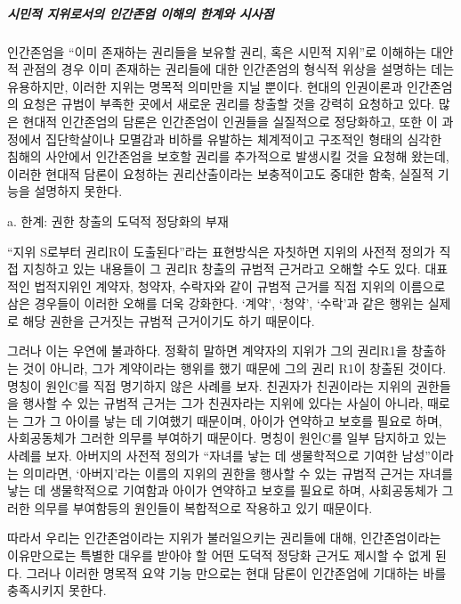 \subparagraph{시민적 지위로서의 인간존엄 이해의 한계와 시사점}

인간존엄을 ``이미 존재하는 권리들을 보유할 권리, 혹은 시민적 지위''로 이해하는 대안적 관점의 경우 이미 존재하는 권리들에 대한 인간존엄의 형식적 위상을 설명하는 데는 유용하지만, 이러한 지위는 명목적 의미만을 지닐 뿐이다. 현대의 인권이론과 인간존엄의 요청은 규범이 부족한 곳에서 새로운 권리를 창출할 것을 강력히 요청하고 있다. 많은 현대적 인간존엄의 담론은 인간존엄이 인권들을 실질적으로 정당화하고, 또한 이 과정에서 집단학살이나 모멸감과 비하를 유발하는 체계적이고 구조적인 형태의 심각한 침해의 사안에서 인간존엄을 보호할 권리를 추가적으로 발생시킬 것을 요청해 왔는데, 이러한 현대적 담론이 요청하는 권리산출이라는 보충적이고도 중대한 함축, 실질적 기능을 설명하지 못한다.

a. 한계: 권한 창출의 도덕적 정당화의 부재

``지위 S로부터 권리R이 도출된다''라는 표현방식은 자칫하면 지위의 사전적 정의가 직접 지칭하고 있는 내용들이 그 권리R 창출의 규범적 근거라고 오해할 수도 있다. 대표적인 법적지위인 계약자, 청약자, 수락자와 같이 규범적 근거를 직접 지위의 이름으로 삼은 경우들이 이러한 오해를 더욱 강화한다. `계약', `청약', `수락'과 같은 행위는 실제로 해당 권한을 근거짓는 규범적 근거이기도 하기 때문이다.

그러나 이는 우연에 불과하다. 정확히 말하면 계약자의 지위가 그의 권리R1을 창출하는 것이 아니라, 그가 계약이라는 행위를 했기 때문에 그의 권리 R1이 창출된 것이다. 명칭이 원인C를 직접 명기하지 않은 사례를 보자. 친권자가 친권이라는 지위의 권한들을 행사할 수 있는 규범적 근거는 그가 친권자라는 지위에 있다는 사실이 아니라, 때로는 그가 그 아이를 낳는 데 기여했기 때문이며, 아이가 연약하고 보호를 필요로 하며, 사회공동체가 그러한 의무를 부여하기 때문이다. 명칭이 원인C를 일부 담지하고 있는 사례를 보자. 아버지의 사전적 정의가 ``자녀를 낳는 데 생물학적으로 기여한 남성''이라는 의미라면, `아버지'라는 이름의 지위의 권한을 행사할 수 있는 규범적 근거는 자녀를 낳는 데 생물학적으로 기여함과 아이가 연약하고 보호를 필요로 하며, 사회공동체가 그러한 의무를 부여함등의 원인들이 복합적으로 작용하고 있기 때문이다.

따라서 우리는 인간존엄이라는 지위가 불러일으키는 권리들에 대해, 인간존엄이라는 이유만으로는 특별한 대우를 받아야 할 어떤 도덕적 정당화 근거도 제시할 수 없게 된다. 그러나 이러한 명목적 요약 기능 만으로는 현대 담론이 인간존엄에 기대하는 바를 충족시키지 못한다.

